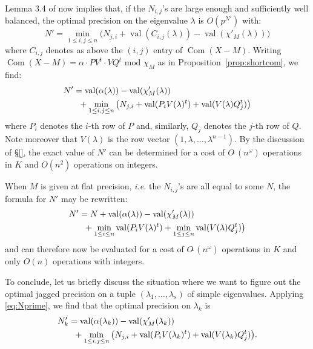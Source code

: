 \documentclass{sig-alternate-05-2015}
\DeclareMathOperator{\val}{val}
\DeclareMathOperator{\com}{Com}
\newcommand{\softO}{O\tilde{~}}
\begin{document}
\noindent
Lemma 3.4 of \cite{caruso-roe-vaccon:14a} now implies that, if the
$N_{i,j}$'s are large enough and sufficiently well balanced, the optimal
precision on the eigenvalue $\lambda$ is $O(p^{N'})$ with:
$$N' = \min_{1 \leq i, j\leq n} \big(N_{j,i} + \val(C_{i,j}(\lambda)) - 
\val(\chi'_M(\lambda))\big)$$
where $C_{i,j}$ denotes as above the $(i,j)$ entry of $\com(X{-}M)$.
Writing
$\com(X{-}M) = \alpha \cdot P V^t \cdot V Q^t \text{ mod } \chi_M$
as in Proposition~\ref{prop:shortcom}, we find:
\begin{align}
N' & = \val(\alpha(\lambda)) - \val(\chi'_M(\lambda)) \nonumber \\
& \hspace{2mm} + \min_{1 \leq i, j\leq n} \big(N_{j,i} + 
\val(P_i V(\lambda)^t) + \val(V(\lambda) Q_j^t)\big) \label{eq:Nprime}
\end{align}
where $P_i$ denotes the $i$-th row of $P$ and, similarly, $Q_j$
denotes the $j$-th row of $Q$. Note moreover that $V(\lambda)$ is
the row vector $(1, \lambda, \ldots, \lambda^{n-1})$.
By the discussion of \S \ref{}, the exact value of $N'$ can be 
determined for a cost of $\softO(n^\omega)$ operations in $K$ and
$O(n^2)$ operations on integers. 

When $M$ is given at flat precision, \emph{i.e.} the $N_{i,j}$'s are all 
equal to some $N$, the formula for $N'$ may be rewritten:
\begin{align}
N' & = N + \val(\alpha(\lambda)) - \val(\chi'_M(\lambda)) \nonumber \\
& \hspace{2mm} + \min_{1 \leq i \leq n} \val(P_i V(\lambda)^t)
+ \min_{1 \leq j \leq n} \val(V(\lambda) Q_j^t)\big) \label{eq:Nprimeflat}
\end{align}
and can therefore now be evaluated for a cost of $\softO(n^\omega)$
operations in $K$ and only $O(n)$ operations with integers.

\medskip

To conclude, let us briefly discuss the situation where we want
to figure out the optimal jagged precision on a tuple $(\lambda_1,
\ldots, \lambda_s)$ of simple eigenvalues. Applying \eqref{eq:Nprime},
we find that the optimal precision on $\lambda_k$ is 
\begin{align*}
N'_k & = \val(\alpha(\lambda_k)) - \val(\chi'_M(\lambda_k)) \\
& \hspace{2mm} + \min_{1 \leq i, j\leq n} \big(N_{j,i} + 
\val(P_i V(\lambda_k)^t) + \val(V(\lambda_k) Q_j^t)\big).
\end{align*}
\end{document}
